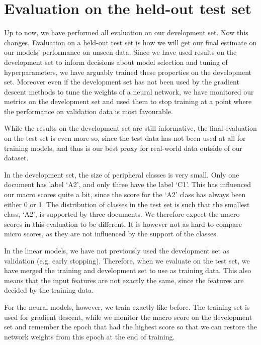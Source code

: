\chapter{Evaluation on the held-out test set} \label{ch:heldout}

Up to now, we have performed all evaluation on our development set. Now this
changes. Evaluation on a held-out test set is how we will get our final
estimate on our models' performance on unseen data. Since we have used
results on the development set to inform decisions about model selection and
tuning of hyperparameters, we have arguably trained these properties on the
development set. Moreover even if the development set has not been used by
the gradient descent methods to tune the weights of a neural network, we have
monitored our metrics on the development set and used them to stop training
at a point where the performance on validation data is most favourable.

While the results on the development set are still informative, the final
evaluation on the test set is even more so, since the test data has not been
used at all for training models, and thus is our best proxy for real-world
data outside of our dataset.

In the development set, the size of peripheral classes is very small. Only
one document has label `A2', and only three have the label `C1'. This has
influenced our macro \FI scores quite a bit, since the \FI score for the `A2'
class has always been either 0 or 1. The distribution of classes in the test
set is such that the smallest class, `A2', is supported by three documents.
We therefore expect the macro \FI scores in this evaluation to be different.
It is however not as hard to compare micro \FI scores, as they are not
influenced by the support of the classes.

In the linear models, we have not previously used the development set as
validation (e.g. early stopping). Therefore, when we evaluate on the test
set, we have merged the training and development set to use as training data.
This also means that the input features are not exactly the same, since the
features are decided by the training data.

For the neural models, however, we train exactly like before. The training
set is used for gradient descent, while we monitor the macro \FI score on the
development set and remember the epoch that had the highest \FI score so that
we can restore the network weights from this epoch at the end of training.

